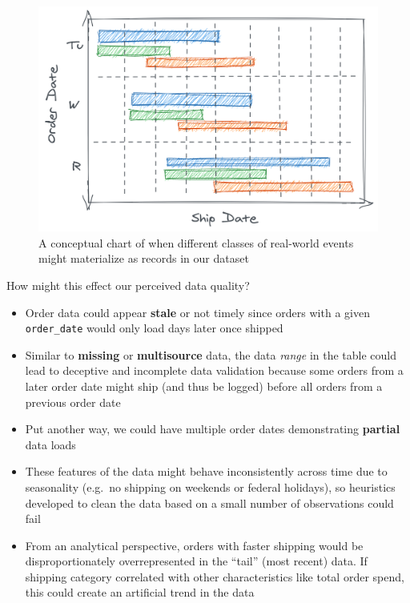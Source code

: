 \documentclass[
]{krantz}
\providecommand{\tightlist}{%
  \setlength{\itemsep}{0pt}\setlength{\parskip}{0pt}}
\begin{document}
\begin{figure}

{\centering \includegraphics[width=0.9\linewidth]{figures/data-dall/order-date} 

}

\caption{A conceptual chart of when different classes of real-world events might materialize as records in our dataset}\label{fig:order-date}
\end{figure}

How might this effect our perceived data quality?

\begin{itemize}
\tightlist
\item
  Order data could appear \textbf{stale} or not timely since orders with a given \texttt{order\_date} would only load days later once shipped
\item
  Similar to \textbf{missing} or \textbf{multisource} data, the data \emph{range} in the table could lead to deceptive and incomplete data validation because some orders from a later order date might ship (and thus be logged) before all orders from a previous order date
\item
  Put another way, we could have multiple order dates demonstrating \textbf{partial} data loads
\item
  These features of the data might behave inconsistently across time due to seasonality (e.g.~no shipping on weekends or federal holidays), so heuristics developed to clean the data based on a small number of observations could fail
\item
  From an analytical perspective, orders with faster shipping would be disproportionately overrepresented in the ``tail'' (most recent) data. If shipping category correlated with other characteristics like total order spend, this could create an artificial trend in the data
\end{itemize}
\end{document}
